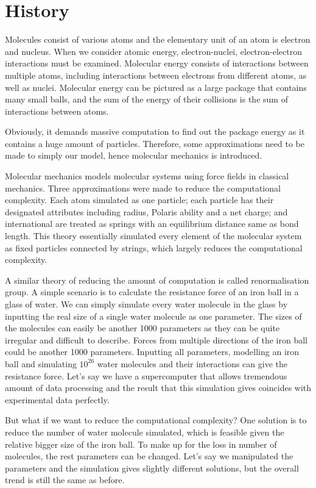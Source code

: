 \documentclass[12pt]{article}
\begin{document}
\section{History}
Molecules consist of various atoms and the elementary unit of an atom is electron and nucleus. When we consider atomic energy, electron-nuclei, electron-electron interactions must be examined. Molecular energy consists of interactions between multiple atoms, including interactions between electrons from different atoms, as well as nuclei. Molecular energy can be pictured as a large package that contains many small balls, and the sum of the energy of their collisions is the sum of interactions between atoms.

Obviously, it demands massive computation to find out the package energy as it contains a huge amount of particles. Therefore, some approximations need to be made to simply our model, hence molecular mechanics is introduced.

Molecular mechanics models molecular systems using force fields in classical mechanics. Three approximations were made to reduce the computational complexity. Each atom simulated as one particle; each particle has their designated attributes including radius, Polaris ability and a net charge; and international are treated as springs with an equilibrium distance same as bond length. This theory essentially simulated every element of the molecular system as fixed particles connected by strings, which largely reduces the computational complexity.

A similar theory of reducing the amount of computation is called renormalisation group. A simple scenario is to calculate the resistance force of an iron ball in a glass of water. We can simply simulate every water molecule in the glass by inputting the real size of a single water molecule as one parameter. The sizes of the molecules can easily be another 1000 parameters as they can be quite irregular and difficult to describe. Forces from multiple directions of the iron ball could be another 1000 parameters. Inputting all parameters, modelling an iron ball and simulating $10^{26}$ water molecules and their interactions can give the resistance force. Let’s say we have a supercomputer that allows tremendous amount of data processing and the result that this simulation gives coincides with experimental data perfectly.

But what if we want to reduce the computational complexity? One solution is to reduce the number of water molecule simulated, which is feasible given the relative bigger size of the iron ball. To make up for the loss in number of molecules, the rest parameters can be changed. Let’s say we manipulated the parameters and the simulation gives slightly different solutions, but the overall trend is still the same as before.
\end{document}
